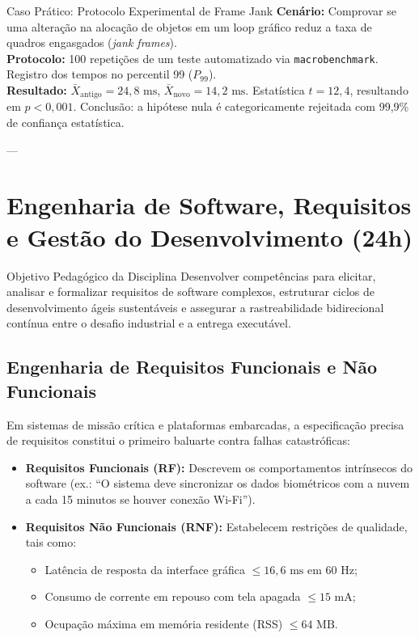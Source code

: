 \begin{casopratico}{Caso Prático: Protocolo Experimental de Frame Jank}
\textbf{Cenário:} Comprovar se uma alteração na alocação de objetos em um loop gráfico reduz a taxa de quadros engasgados (\textit{jank frames}).\\
\textbf{Protocolo:} 100 repetições de um teste automatizado via \texttt{macrobenchmark}. Registro dos tempos no percentil 99 ($P_{99}$).\\
\textbf{Resultado:} $\bar{X}_{\text{antigo}} = 24{,}8\text{ ms}$, $\bar{X}_{\text{novo}} = 14{,}2\text{ ms}$. Estatística $t = 12{,}4$, resultando em $p < 0{,}001$. Conclusão: a hipótese nula é categoricamente rejeitada com 99{,}9\% de confiança estatística.
\end{casopratico}

---

\section{Engenharia de Software, Requisitos e Gestão do Desenvolvimento (24h)}

\begin{pedagogico}{Objetivo Pedagógico da Disciplina}
Desenvolver competências para elicitar, analisar e formalizar requisitos de software complexos, estruturar ciclos de desenvolvimento ágeis sustentáveis e assegurar a rastreabilidade bidirecional contínua entre o desafio industrial e a entrega executável.
\end{pedagogico}

\subsection{Engenharia de Requisitos Funcionais e Não Funcionais}
Em sistemas de missão crítica e plataformas embarcadas, a especificação precisa de requisitos constitui o primeiro baluarte contra falhas catastróficas:
\begin{itemize}
    \item \textbf{Requisitos Funcionais (RF):} Descrevem os comportamentos intrínsecos do software (ex.: ``O sistema deve sincronizar os dados biométricos com a nuvem a cada 15 minutos se houver conexão Wi-Fi'').
    \item \textbf{Requisitos Não Funcionais (RNF):} Estabelecem restrições de qualidade, tais como:
    \begin{itemize}
        \item Latência de resposta da interface gráfica $\le 16{,}6\text{ ms}$ em 60 Hz;
        \item Consumo de corrente em repouso com tela apagada $\le 15\text{ mA}$;
        \item Ocupação máxima em memória residente (RSS) $\le 64\text{ MB}$.
    \end{itemize}
\end{itemize}

